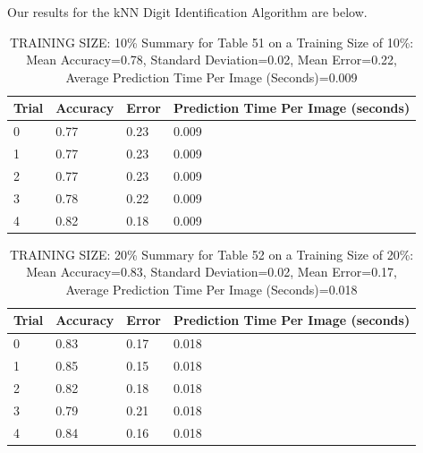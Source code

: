 \documentclass{article}
\begin{document}
Our results for the kNN Digit Identification Algorithm are below.\\

\begin{table}[H]

\centering
{\begin{tabular}{||p{1cm}|p{1.8cm}|p{1.8cm}|p{3cm}||}
 \hline
Trial & Accuracy & Error & Prediction Time Per Image (seconds) \\ [0.5ex] 
 \hline\hline
   0  & 0.77  & 0.23  & 0.009\\
\hline
   1  & 0.77  & 0.23  & 0.009\\
\hline
   2  & 0.77  & 0.23  & 0.009\\
\hline
   3  & 0.78  & 0.22  & 0.009\\
\hline
   4  & 0.82  & 0.18  & 0.009\\
\hline

\end{tabular}}
\caption{TRAINING SIZE: 10\% \newline Summary for Table 51 on a Training Size of 10\%: Mean Accuracy=0.78, Standard Deviation=0.02, Mean Error=0.22, Average Prediction Time Per Image (Seconds)=0.009}
\end{table} 

\begin{table}[H]

\centering
{\begin{tabular}{||p{1cm}|p{1.8cm}|p{1.8cm}|p{3cm}||}
 \hline
Trial & Accuracy & Error & Prediction Time Per Image (seconds) \\ [0.5ex] 
 \hline\hline
   0  & 0.83  & 0.17  & 0.018\\
\hline
   1  & 0.85  & 0.15  & 0.018\\
\hline
   2  & 0.82  & 0.18  & 0.018\\
\hline
   3  & 0.79  & 0.21  & 0.018\\
\hline
   4  & 0.84  & 0.16  & 0.018\\
\hline

\end{tabular}}
\caption{TRAINING SIZE: 20\% \newline Summary for Table 52 on a Training Size of 20\%: Mean Accuracy=0.83, Standard Deviation=0.02, Mean Error=0.17, Average Prediction Time Per Image (Seconds)=0.018}
\end{table} 
\end{document}

